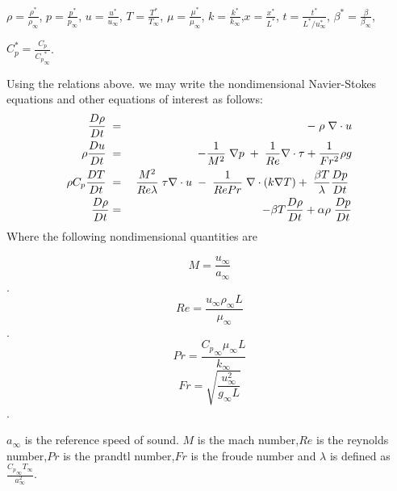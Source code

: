 \documentclass[10pt]{ubthesis}
\begin{document}
\bigskip

$\rho = \frac{\rho^*}{\rho_\infty} $, $p = \frac{p^*}{p_\infty} $, $u = \frac{u^*}{u_\infty} $, $T = \frac{T^*}{T_\infty} $, $\mu = \frac{\mu^*}{\mu_\infty} $, $k = \frac{k^*}{k_\infty} $,$x = \frac{x^*}{L^*} $, $t = \frac{t^*}{L^*/u^*_{\infty}} $, $\beta^* = \frac{\beta}{\beta_{\infty}} $, 
\bigskip

$C_p^* = \frac{C_p}{{C_p}^*_{\infty}}$.

Using the relations above. we may write the nondimensional
Navier-Stokes equations and other equations of interest as follows:
\begin{eqnarray}
\frac{D \rho}{D t}\hspace{1mm} &=& -\hspace{1mm}\rho \hspace{1mm}\nabla \cdot u \\
\rho \frac{D u}{D t} \hspace{1mm} &=& -\frac{1}{M^2}\hspace{1mm}\nabla p\hspace{1mm}+\hspace{1mm}\frac{1}{Re}\nabla \cdot \tau + \frac{1}{Fr^2}\rho g \\
\rho C_p \frac{D T}{D t} \hspace{1mm}&=&\hspace{1mm} \frac{M^2}{Re \lambda}\hspace{1mm}\tau \nabla \cdot u \hspace{1mm}-\hspace{1mm}\frac{1}{Re Pr} \hspace{1mm}\nabla \cdot (k \nabla T) + \hspace{1mm} \frac{\beta T}{\lambda} \frac{D p}{D t}\hspace{1mm} \\
\frac{D \rho}{D t} &=& \hspace{1mm} - \beta T \frac{D \rho}{D t} + \alpha \rho \hspace{1mm}\frac{D p}{D t}
\end{eqnarray}
Where the following nondimensional quantities are

$$M= \frac{u_\infty}{a_\infty}$$. 
$$Re= \frac{u_\infty \rho_\infty L}{\mu_\infty}$$. 
$$Pr= \frac{{C_p}_\infty \mu_\infty L}{k_\infty}$$
$$Fr= \sqrt{\frac{u_\infty^2} {g_\infty L}}$$. 

\noindent $a_{\infty}$ is the reference speed of sound. $M$ is the mach number,$Re$ is the reynolds number,$Pr$ is the prandtl number,$Fr$ is the froude number and $\lambda$ is defined as $\frac{{C_p}_\infty T_\infty }{a^2_\infty}$. 
\end{document}
